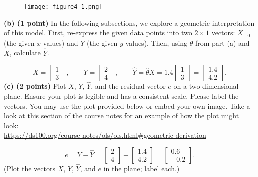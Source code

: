 \documentclass[11pt]{article}
\begin{document}
\begin{figure}[h!]
    \centering
    \texttt{[image: figure4\_1.png]}
\end{figure}

\medskip
\noindent \textbf{(b) (1 point)} In the following subsections, we explore a geometric interpretation of this model. First, re-express the given data points into two $2\times 1$ vectors: $X_{:,0}$ (the given $x$ values) and $Y$ (the given $y$ values). Then, using $\hat{\theta}$ from part (a) and $X$, calculate $\hat{Y}$.

\[
X=\begin{bmatrix}1\\3\end{bmatrix},\qquad
Y=\begin{bmatrix}2\\4\end{bmatrix},\qquad
\hat Y=\hat\theta X=1.4\!\begin{bmatrix}1\\3\end{bmatrix}
=\boxed{\begin{bmatrix}1.4\\[2pt]4.2\end{bmatrix}}.
\]
\newpage
\medskip
\noindent \textbf{(c) (2 points)} Plot $X$, $Y$, $\hat{Y}$, and the residual vector $e$ on a two-dimensional plane. Ensure your plot is legible and has a consistent scale. Please label the vectors. You may use the plot provided below or embed your own image. Take a look at this section of the course notes for an example of how the plot might look: \\
\url{https://ds100.org/course-notes/ols/ols.html#geometric-derivation}

\[
e=Y-\hat Y=\begin{bmatrix}2\\4\end{bmatrix}-\begin{bmatrix}1.4\\4.2\end{bmatrix}
=\boxed{\begin{bmatrix}0.6\\-0.2\end{bmatrix}}.
\]
(Plot the vectors $X$, $Y$, $\hat Y$, and $e$ in the plane; label each.)
\end{document}
